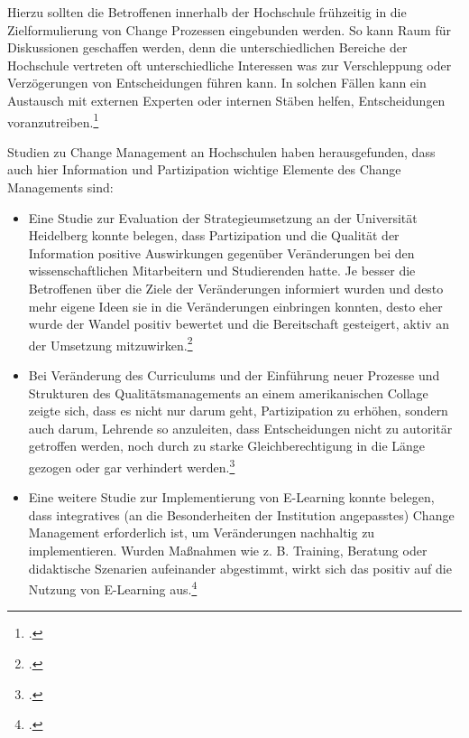 Hierzu sollten die Betroffenen innerhalb der Hochschule frühzeitig in die Zielformulierung von Change Prozessen eingebunden werden. So kann Raum für Diskussionen geschaffen werden, denn die unterschiedlichen Bereiche der Hochschule vertreten oft unterschiedliche Interessen was zur Verschleppung oder Verzögerungen von Entscheidungen führen kann. In solchen Fällen kann ein Austausch mit externen Experten oder internen Stäben helfen, Entscheidungen voranzutreiben.\footcite[Vgl.][]{sonntag_change_2008}

Studien zu Change Management an Hochschulen haben herausgefunden, dass auch hier Information und Partizipation wichtige Elemente des Change Managements sind:
\begin{itemize}
	\item Eine Studie zur Evaluation der Strategieumsetzung an der Universität Heidelberg konnte belegen, dass Partizipation und die Qualität der Information positive Auswirkungen gegenüber Veränderungen bei den wissenschaftlichen Mitarbeitern und Studierenden hatte. Je besser die Betroffenen über die Ziele der Veränderungen informiert wurden und desto mehr eigene Ideen sie in die Veränderungen einbringen konnten, desto eher wurde der Wandel positiv bewertet und die Bereitschaft gesteigert, aktiv an der Umsetzung mitzuwirken.\footcite[Vgl. Meiser et al., Michel et al. zitiert nach][]{sonntag_change_2008}
	
	\item Bei Veränderung des Curriculums und der Einführung neuer Prozesse und Strukturen des Qualitätsmanagements an einem amerikanischen Collage zeigte sich, dass es nicht nur darum geht, Partizipation zu erhöhen, sondern auch darum, Lehrende so anzuleiten, dass Entscheidungen nicht zu autoritär getroffen werden, noch durch zu starke Gleichberechtigung in die Länge gezogen oder gar verhindert werden.\footcite[Vgl. Cohen, Fetters und Fleischmann zitiert nach][]{sonntag_change_2008}
	
	\item Eine weitere Studie zur Implementierung von E-Learning konnte belegen, dass integratives (an die Besonderheiten der Institution angepasstes) Change Management erforderlich ist, um Veränderungen nachhaltig zu implementieren. Wurden Maßnahmen wie z. B. Training, Beratung oder didaktische Szenarien aufeinander abgestimmt, wirkt sich das positiv auf die Nutzung von E-Learning aus.\footcite[Vgl. Fuchs, Schönwald zitiert nach][]{sonntag_change_2008}
\end{itemize}

